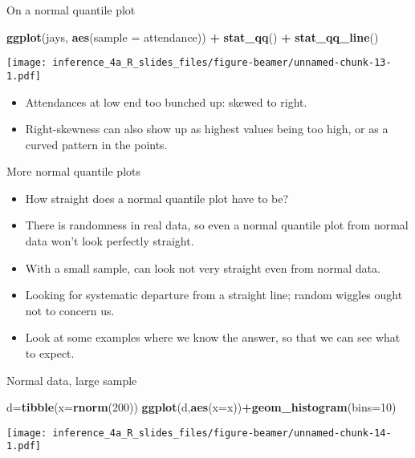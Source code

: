 \documentclass[
  ignorenonframetext,
]{beamer}
\newenvironment{Shaded}{\begin{snugshade}}{\end{snugshade}}
\newcommand{\DataTypeTok}[1]{\textcolor[rgb]{0.13,0.29,0.53}{#1}}
\newcommand{\DecValTok}[1]{\textcolor[rgb]{0.00,0.00,0.81}{#1}}
\newcommand{\KeywordTok}[1]{\textcolor[rgb]{0.13,0.29,0.53}{\textbf{#1}}}
\newcommand{\NormalTok}[1]{#1}
\newcommand{\OperatorTok}[1]{\textcolor[rgb]{0.81,0.36,0.00}{\textbf{#1}}}
\newcommand{\StringTok}[1]{\textcolor[rgb]{0.31,0.60,0.02}{#1}}
\providecommand{\tightlist}{%
  \setlength{\itemsep}{0pt}\setlength{\parskip}{0pt}}
\begin{document}
\begin{frame}[fragile]{On a normal quantile plot}
\protect\hypertarget{on-a-normal-quantile-plot}{}
\begin{Shaded}
\begin{Highlighting}[]
\KeywordTok{ggplot}\NormalTok{(jays, }\KeywordTok{aes}\NormalTok{(}\DataTypeTok{sample =}\NormalTok{ attendance)) }\OperatorTok{+}\StringTok{ }
\StringTok{  }\KeywordTok{stat\_qq}\NormalTok{() }\OperatorTok{+}\StringTok{ }\KeywordTok{stat\_qq\_line}\NormalTok{()}
\end{Highlighting}
\end{Shaded}

\texttt{[image: inference\_4a\_R\_slides\_files/figure-beamer/unnamed-chunk-13-1.pdf]}

\begin{itemize}
\tightlist
\item
  Attendances at low end too bunched up: skewed to right.
\item
  Right-skewness can also show up as highest values being too high, or
  as a curved pattern in the points.
\end{itemize}
\end{frame}

\begin{frame}{More normal quantile plots}
\protect\hypertarget{more-normal-quantile-plots}{}
\begin{itemize}
\tightlist
\item
  How straight does a normal quantile plot have to be?
\item
  There is randomness in real data, so even a normal quantile plot from
  normal data won't look perfectly straight.
\item
  With a small sample, can look not very straight even from normal data.
\item
  Looking for systematic departure from a straight line; random wiggles
  ought not to concern us.
\item
  Look at some examples where we know the answer, so that we can see
  what to expect.
\end{itemize}
\end{frame}

\begin{frame}[fragile]{Normal data, large sample}
\protect\hypertarget{normal-data-large-sample}{}
\begin{Shaded}
\begin{Highlighting}[]
\NormalTok{d=}\KeywordTok{tibble}\NormalTok{(}\DataTypeTok{x=}\KeywordTok{rnorm}\NormalTok{(}\DecValTok{200}\NormalTok{))}
\KeywordTok{ggplot}\NormalTok{(d,}\KeywordTok{aes}\NormalTok{(}\DataTypeTok{x=}\NormalTok{x))}\OperatorTok{+}\KeywordTok{geom\_histogram}\NormalTok{(}\DataTypeTok{bins=}\DecValTok{10}\NormalTok{)}
\end{Highlighting}
\end{Shaded}

\texttt{[image: inference\_4a\_R\_slides\_files/figure-beamer/unnamed-chunk-14-1.pdf]}
\end{frame}
\end{document}
